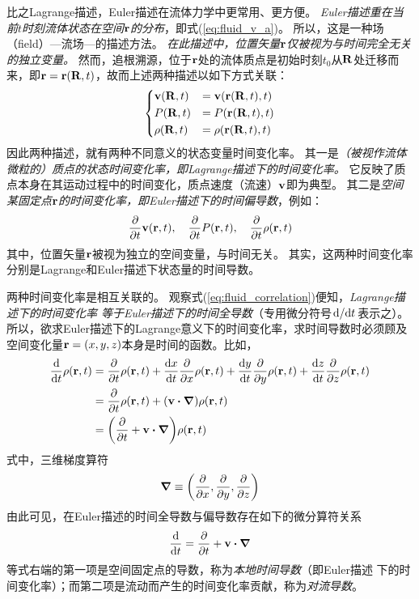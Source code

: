 \documentclass[UTF8]{ctexbook}
\begin{document}
比之Lagrange描述，Euler描述在流体力学中更常用、更方便。
\emph{Euler描述重在当前$t$时刻流体状态在空间$\vb{r}$的分布}，即式(\ref{eq:fluid_v_a})。
所以，这是一种场（field）---流场---的描述方法。
\emph{在此描述中，位置矢量$\vb{r}$仅被视为与时间完全无关的独立变量。}
然而，追根溯源，位于$\vb{r}$处的流体质点是初始时刻$t_0$从$\vb{R}$处迁移而
来，即$\vb{r}=\vb{r}(\vb{R},t)$，故而上述两种描述以如下方式关联：
\begin{equation}
	\begin{dcases}
		\vb{v}(\vb{R},t) & = \vb{v}\qty(\vb{r}(\vb{R},t),t)\\
		{P}(\vb{R},t) & = P\qty(\vb{r}(\vb{R},t),t)\\
		{\rho}(\vb{R},t) & =\rho\qty(\vb{r}(\vb{R},t),t)\\
	\end{dcases}
\label{eq:fluid_correlation}
\end{equation}
因此两种描述，就有两种不同意义的状态变量时间变化率。
其一是\emph{（被视作流体微粒的）质点的状态时间变化率，即Lagrange描述下的时间变化率。}
它反映了质点本身在其运动过程中的时间变化，质点速度（流速）$\vb{v}$即为典型。
其二是\emph{空间某固定点$\vb{r}$的时间变化率，即Euler描述下的时间偏导数}，例如：
$$
\pdv{t}\vb{v}(\vb{r},t)\qc 
\pdv{t}P(\vb{r},t)\qc 
\pdv{t}\rho(\vb{r},t)
$$
其中，位置矢量$\vb{r}$被视为独立的空间变量，与时间无关。
其实，这两种时间变化率分别是Lagrange和Euler描述下状态量的时间导数。

两种时间变化率是相互关联的。
观察式(\ref{eq:fluid_correlation})便知，\emph{Lagrange描述下的时间变化率
等于Euler描述下的时间全导数}（专用微分符号$\dv*{t}$表示之）。
所以，欲求Euler描述下的Lagrange意义下的时间变化率，求时间导数时必须顾及
空间变化量$\vb{r}=(x,y,z)$本身是时间的函数。比如，
\begin{align*}
	\dv{t} \rho(\vb{r},t) & = \pdv{t}\rho (\vb{r},t)+\dv{x}{t} \pdv{x}
	\rho(\vb{r},t) +\dv{y}{t} \pdv{y} \rho(\vb{r},t)+\dv{z}{t} \pdv{z} \rho
	(\vb{r},t)\\
	&=\pdv{t}\rho(\vb{r},t) + (\vb{v}\vdot \grad)\rho(\vb{r},t)\\
	&=\qty(\pdv{t} + \vb{v}\vdot \grad )\rho (\vb{r},t)
\end{align*}
式中，三维梯度算符
$$\grad \equiv \qty(\pdv{x}, \pdv{y}, \pdv{z})$$
由此可见，在Euler描述的时间全导数与偏导数存在如下的微分算符关系
\begin{equation}
	\dv{t} = \pdv{t} + \vb{v}\vdot \grad
\end{equation}
等式右端的第一项是空间固定点的导数，称为\emph{本地时间导数}（即Euler描述
下的时间变化率）；而第二项是流动而产生的时间变化率贡献，称为\emph{对流导数}。
\end{document}
